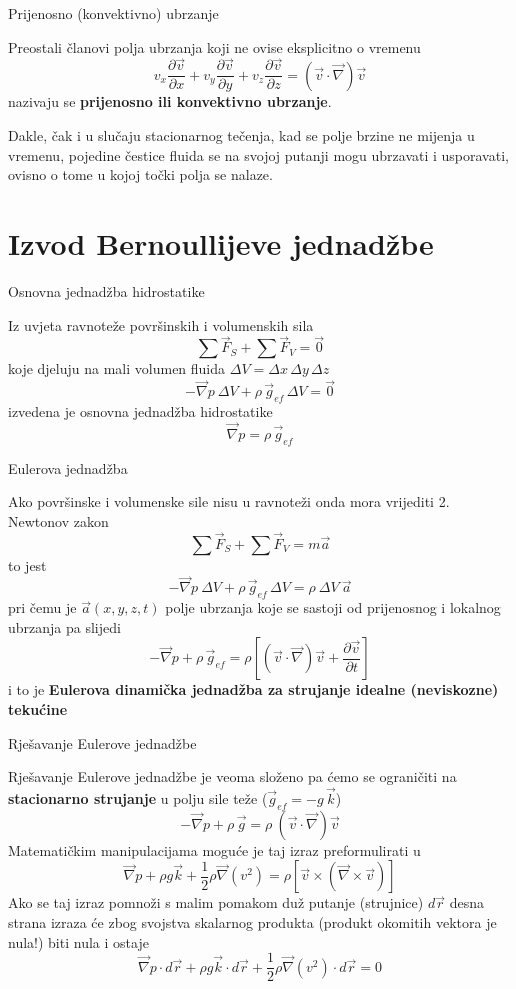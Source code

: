 \documentclass[croatian]{beamer}
\begin{document}
\begin{frame}{Prijenosno (konvektivno) ubrzanje}

Preostali članovi polja ubrzanja koji ne ovise eksplicitno o vremenu
\[
v_{x}\frac{\partial\vec{v}}{\partial x}+v_{y}\frac{\partial\vec{v}}{\partial y}+v_{z}\frac{\partial\vec{v}}{\partial z}=(\vec{v}\cdot\vec{\nabla})\vec{v}
\]
nazivaju se \textbf{prijenosno ili konvektivno ubrzanje}.
\begin{block}{}
Dakle, čak i u slučaju stacionarnog tečenja, kad se polje brzine
ne mijenja u vremenu, pojedine čestice fluida se na svojoj putanji
mogu ubrzavati i usporavati, ovisno o tome u kojoj točki polja se
nalaze.
\end{block}
\end{frame}

\section{Izvod Bernoullijeve jednadžbe}

\begin{frame}{Osnovna jednadžba hidrostatike}

Iz uvjeta ravnoteže površinskih i volumenskih sila 
\[
\sum\vec{F}_{S}+\sum\vec{F}_{V}=\vec{0}
\]
koje djeluju na mali volumen fluida $\Delta V=\Delta x\,\Delta y\,\Delta z$
\[
-\vec{\nabla}p\:\Delta V+\rho\,\vec{g}_{ef}\,\Delta V=\vec{0}
\]
izvedena je osnovna jednadžba hidrostatike
\[
\vec{\nabla}p=\rho\,\vec{g}_{ef}
\]
\end{frame}

\begin{frame}{Eulerova jednadžba}

Ako površinske i volumenske sile nisu u ravnoteži onda mora vrijediti
2. Newtonov zakon
\[
\sum\vec{F}_{S}+\sum\vec{F}_{V}=m\vec{a}
\]
to jest
\[
-\vec{\nabla}p\:\Delta V+\rho\,\vec{g}_{ef}\,\Delta V=\rho\:\Delta V\:\vec{a}
\]
pri čemu je $\vec{a}(x,y,z,t)$ polje ubrzanja koje se sastoji od
prijenosnog i lokalnog ubrzanja pa slijedi
\[
-\vec{\nabla}p+\rho\,\vec{g}_{ef}=\rho[(\vec{v}\cdot\vec{\nabla})\vec{v}+\frac{\partial\vec{v}}{\partial t}]
\]
i to je \textbf{Eulerova dinamička jednadžba za strujanje idealne
(neviskozne) tekućine}
\end{frame}

\begin{frame}{Rješavanje Eulerove jednadžbe}

Rješavanje Eulerove jednadžbe je veoma složeno pa ćemo se ograničiti
na \textbf{stacionarno strujanje }u polju sile teže ($\vec{g}_{ef}=-g\,\vec{k}$)
\[
-\vec{\nabla}p+\rho\,\vec{g}=\rho\:(\vec{v}\cdot\vec{\nabla})\vec{v}
\]
Matematičkim manipulacijama moguće je taj izraz preformulirati u
\[
\vec{\nabla}p+\rho g\vec{k}+\frac{1}{2}\rho\vec{\nabla}(v^{2})=\rho[\vec{v}\times(\vec{\nabla}\times\vec{v})]
\]
Ako se taj izraz pomnoži s malim pomakom duž putanje (strujnice) $d\vec{r}$
desna strana izraza će zbog svojstva skalarnog produkta (produkt okomitih
vektora je nula!) biti nula i ostaje 
\[
\vec{\nabla}p\cdot d\vec{r}+\rho g\vec{k}\cdot d\vec{r}+\frac{1}{2}\rho\vec{\nabla}(v^{2})\cdot d\vec{r}=0
\]
\end{frame}
\end{document}
